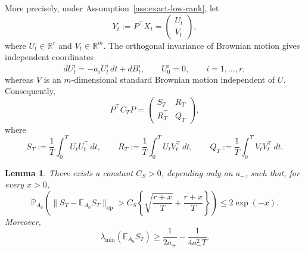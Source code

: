 \documentclass[11pt]{article}
\newtheorem{lemma}[theorem]{Lemma}
\begin{document}
More precisely, under Assumption~\ref{ass:exact-low-rank}, let
\[
    Y_t:=P^\top X_t=
    \begin{pmatrix}U_t\\V_t\end{pmatrix},
\]
where $U_t\in\mathbb R^r$ and $V_t\in\mathbb R^m$. The orthogonal invariance
of Brownian motion gives independent coordinates
\begin{equation}
    dU_t^i=-a_iU_t^i\,dt+dB_t^i,
    \qquad U_0^i=0,
    \qquad i=1,\ldots,r,
\label{eq:stable-coordinate-model}
\end{equation}
whereas $V$ is an $m$-dimensional standard Brownian motion independent of $U$.
Consequently,
\begin{equation}
    P^\top C_TP
    =
    \begin{pmatrix}
        S_T & R_T\\
        R_T^\top & Q_T
    \end{pmatrix},
\label{eq:exact-low-rank-block-covariance}
\end{equation}
where
\begin{equation}
    S_T:=\frac1T\int_0^T U_tU_t^\top\,dt,
    \qquad
    R_T:=\frac1T\int_0^T U_tV_t^\top\,dt,
    \qquad
    Q_T:=\frac1T\int_0^T V_tV_t^\top\,dt.
\label{eq:exact-low-rank-block-definitions}
\end{equation}

\begin{lemma}%
\label{lem:exact-low-rank-stable-block}
There exists a constant $C_S>0$, depending only on $a_-$, such that, for every
$x>0$,
\begin{equation}
    \mathbb P_{A_0}\!\left(
        \|S_T-\mathbb E_{A_0}S_T\|_{\mathrm{op}}
        >C_S\left\{
            \sqrt{\frac{r+x}{T}}+\frac{r+x}{T}
        \right\}
    \right)
    \leq2\exp(-x).
\label{eq:exact-low-rank-stable-concentration}
\end{equation}
Moreover,
\begin{equation}
    \lambda_{\min}\!\left(\mathbb E_{A_0}S_T\right)
    \geq
    \frac1{2a_+}-\frac1{4a_-^2T}.
\label{eq:exact-low-rank-stable-mean-lower}
\end{equation}
\end{lemma}
\end{document}
